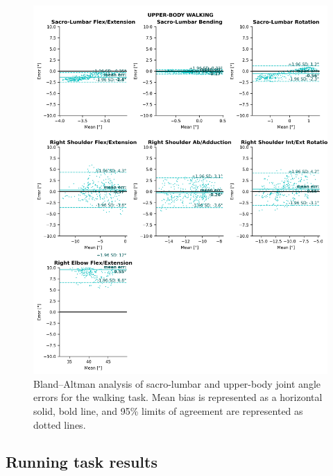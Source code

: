 \begin{figure}[!ht]
	\centering
	\def\svgwidth{1\columnwidth}
	\fontsize{10pt}{10pt}\selectfont
	\includegraphics[height=\dimexpr\textheight-119pt]{"../Annexes/Figures/Fig_BlandWalkUp.png"}
	\caption{Bland–Altman analysis of sacro-lumbar and upper-body joint angle errors for the walking task. Mean bias is represented as a horizontal solid, bold line, and 95\% limits of agreement are represented as dotted lines.}
	\label{fig_blandwalkup}
\end{figure}

\FloatBarrier
\subsection{Running task results}

